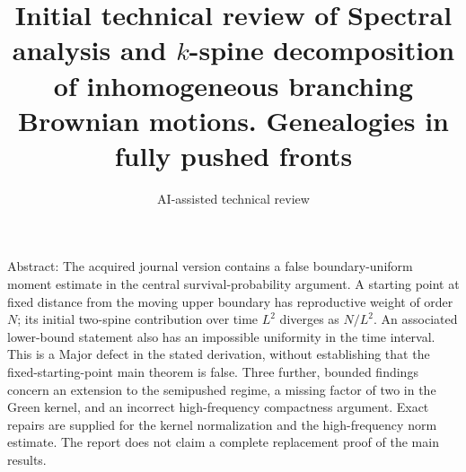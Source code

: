 \documentclass[10pt]{article}
\title{Initial technical review of
Spectral analysis and \(k\)-spine decomposition of inhomogeneous branching Brownian motions. Genealogies in fully pushed fronts}
\author{AI-assisted technical review}
\date{}
\begin{document}
\maketitle
Abstract: The acquired journal version contains a false boundary-uniform moment estimate in the central survival-probability argument. A starting point at fixed distance from the moving upper boundary has reproductive weight of order \(N\); its initial two-spine contribution over time \(L^2\) diverges as \(N/L^2\). An associated lower-bound statement also has an impossible uniformity in the time interval. This is a Major defect in the stated derivation, without establishing that the fixed-starting-point main theorem is false. Three further, bounded findings concern an extension to the semipushed regime, a missing factor of two in the Green kernel, and an incorrect high-frequency compactness argument. Exact repairs are supplied for the kernel normalization and the high-frequency norm estimate. The report does not claim a complete replacement proof of the main results.\par
\end{document}

